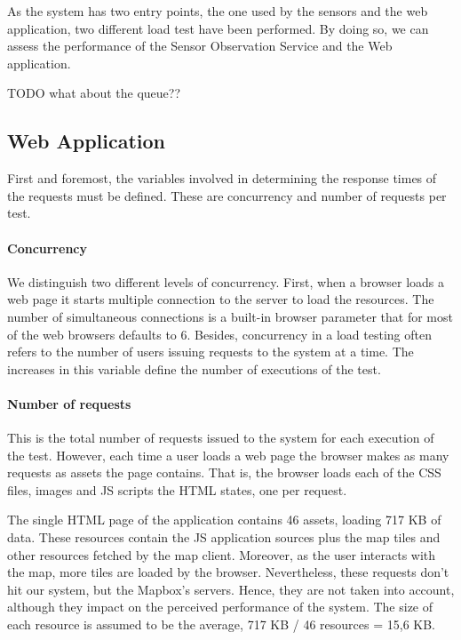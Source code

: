 As the system has two entry points, the one used by the sensors and the web application, two different load test have been performed. By doing so, we can assess the performance of the Sensor Observation Service and the Web application.

TODO what about the queue??

\subsection{Web Application}

First and foremost, the variables involved in determining the response times of the requests must be defined. These are concurrency and number of requests per test.

\paragraph{Concurrency} We distinguish two different levels of concurrency. First, when a browser loads a web page it starts multiple connection to the server to load the resources. The number of simultaneous connections is a built-in browser parameter that for most of the web browsers defaults to 6. Besides, concurrency in a load testing often refers to the number of users issuing requests to the system at a time. The increases in this variable define the number of executions of the test.

\paragraph{Number of requests} This is the total number of requests issued to the system for each execution of the test. However, each time a user loads a web page the browser makes as many requests as assets the page contains. That is, the browser loads each of the CSS files, images and JS scripts the HTML states, one per request.

The single HTML page of the application contains 46 assets, loading 717 KB of data. These resources contain the JS application sources plus the map tiles and other resources fetched by the map client. Moreover, as the user interacts with the map, more tiles are loaded by the browser. Nevertheless, these requests don't hit our system, but the Mapbox's servers. Hence, they are not taken into account, although they impact on the perceived performance of the system. The size of each resource is assumed to be the average, 717 KB / 46 resources = 15,6 KB.

